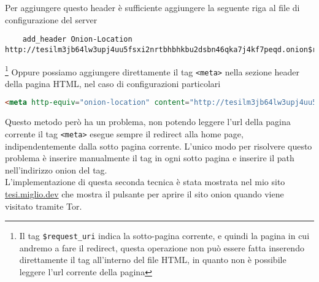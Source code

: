 \newpage
Per aggiungere questo header è sufficiente aggiungere la seguente riga al file di configurazione del server
\begin{lstlisting}
    add_header Onion-Location http://tesilm3jb64lw3upj4uu5fsxi2nrtbhbhkbu2dsbn46qka7j4kf7peqd.onion$request_uri;
\end{lstlisting}
\footnote{Il tag \lstinline{$request_uri} indica la sotto-pagina corrente, e quindi la pagina in cui andremo a fare il redirect, questa operazione non può essere fatta inserendo direttamente il tag all'interno del file HTML, in quanto non è possibile leggere l'url corrente della pagina}
Oppure possiamo aggiungere direttamente il tag \lstinline{<meta>} nella sezione header della pagina HTML, nel caso di configurazioni particolari
\begin{lstlisting}[language=HTML]
    <meta http-equiv="onion-location" content="http://tesilm3jb64lw3upj4uu5fsxi2nrtbhbhkbu2dsbn46qka7j4kf7peqd.onion" />
\end{lstlisting}
Questo metodo però ha un problema, non potendo leggere l'url della pagina corrente il tag \lstinline{<meta>} esegue sempre il redirect alla home page, indipendentemente dalla sotto pagina corrente. 
L'unico modo per risolvere questo problema è inserire manualmente il tag in ogni sotto pagina e inserire il path nell'indirizzo onion del tag. \\
L'implementazione di questa seconda tecnica è stata mostrata nel mio sito \href{https://tesi.miglio.dev}{tesi.miglio.dev} che mostra il pulsante per aprire il sito onion quando viene visitato tramite Tor. \\
\cite{OnionLocationHeader}
